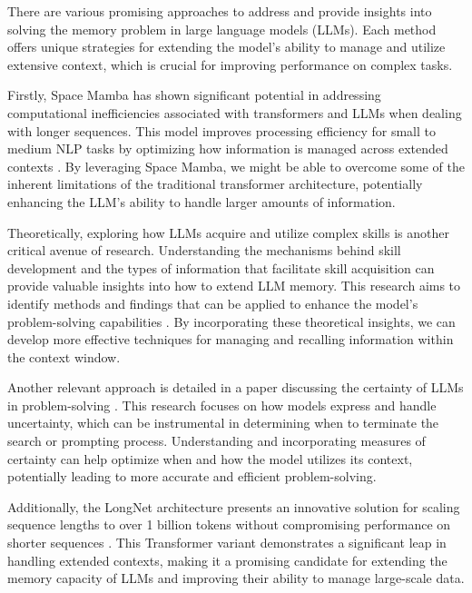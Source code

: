 \documentclass{article}
\begin{document}
There are various promising approaches to address and provide insights into solving the memory problem in large language models (LLMs). Each method offers unique strategies for extending the model’s ability to manage and utilize extensive context, which is crucial for improving performance on complex tasks.

Firstly, Space Mamba has shown significant potential in addressing computational inefficiencies associated with transformers and LLMs when dealing with longer sequences. This model improves processing efficiency for small to medium NLP tasks by optimizing how information is managed across extended contexts \cite{hamdan2024sparsemambareinforcingcontrollability}. By leveraging Space Mamba, we might be able to overcome some of the inherent limitations of the traditional transformer architecture, potentially enhancing the LLM’s ability to handle larger amounts of information.

Theoretically, exploring how LLMs acquire and utilize complex skills is another critical avenue of research. Understanding the mechanisms behind skill development and the types of information that facilitate skill acquisition can provide valuable insights into how to extend LLM memory. This research aims to identify methods and findings that can be applied to enhance the model’s problem-solving capabilities \cite{arora2023theoryemergencecomplexskills}. By incorporating these theoretical insights, we can develop more effective techniques for managing and recalling information within the context window.

Another relevant approach is detailed in a paper discussing the certainty of LLMs in problem-solving \cite{lin2022teachingmodelsexpressuncertainty}. This research focuses on how models express and handle uncertainty, which can be instrumental in determining when to terminate the search or prompting process. Understanding and incorporating measures of certainty can help optimize when and how the model utilizes its context, potentially leading to more accurate and efficient problem-solving.

Additionally, the LongNet architecture presents an innovative solution for scaling sequence lengths to over 1 billion tokens without compromising performance on shorter sequences \cite{ding2023longnetscalingtransformers1000000000}. This Transformer variant demonstrates a significant leap in handling extended contexts, making it a promising candidate for extending the memory capacity of LLMs and improving their ability to manage large-scale data.
\end{document}
